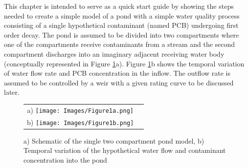 This chapter is intended to serve as a quick start guide by showing the steps needed to create a simple model of a pond with a simple water quality process consisting of a single hypothetical contaminant (named PCB) undergoing first order decay. The pond is assumed to be divided into two compartments where one of the compartments receive contaminants from a stream and the second compartment discharges into an imaginary adjacent receiving water body (conceptually represented in Figure \ref{fig:1}a). Figure \ref{fig:1}b shows the temporal variation of water flow rate and PCB concentration in the inflow. The outflow rate is assumed to be controlled by a weir with a given rating curve to be discussed later. \\

\begin{figure}[!ht]
\begin{center}
\begin{tabular}{c c}
a) \texttt{[image: Images/Figure1a.png]} \\
b) \texttt{[image: Images/Figure1b.png]} \\
\end{tabular}
\caption{a) Schematic of the single two compartment pond model, b) Temporal variation of the hypothetical water flow and contaminant concentration into the pond} \label{fig:1}
\end{center}
\end{figure}

